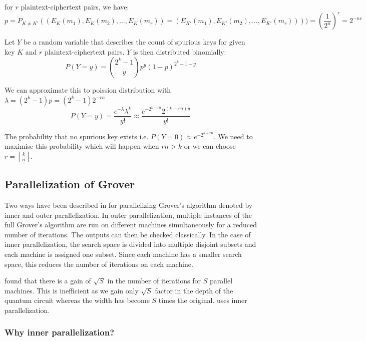 \documentclass[preprint]{transcrypto}
\begin{document}
for $r$ plaintext-ciphertext pairs, we have:
\begin{equation*}
    p = P_{K \not = K'}((E_K(m_1), E_K(m_2), \dots ,E_K(m_r) ) = (E_{K'}(m_1),E_{K'}(m_2), \dots, E_{K'}(m_r)) )) = \left(\frac{1}{2^n}\right)^r = 2^{-nr}
\end{equation*}

Let $Y$ be a random variable that describes the count of spurious keys for given key $K$ and $r$ plaintext-ciphertext pairs. $Y$ is then distributed binomially:
\begin{equation*}
    P(Y = y) = {2^k - 1 \choose y} p^y(1-p)^{2^k - 1- y}
\end{equation*}

We can approximate this to poission distribution with $\lambda = (2^k-1)p = (2^k - 1)2^{-rn} $
\begin{equation*}
    P(Y=y) = \frac{e^{-\lambda}\lambda^k}{y!} \approx  \frac{e^{-2^{k-rn}}2^{(k-rn)y}}{y!}
\end{equation*}

The probability that no spurious key exists i.e. $P(Y = 0) \approx e^{-2^{k-rn}}$. We need to maximise this probability which will happen when $rn > k$ or we can choose $r = \left\lceil \frac{k}{n} \right\rceil$.

\subsection{Parallelization of Grover}

Two ways have been described in \cite{tsc} for parallelizing Grover's algorithm denoted by inner and outer parallelization. In outer parallelization, multiple instances of the full Grover's algorithm are run on different machines simultaneously for a reduced number of iterations. The outputs can then be checked classically. In the case of inner parallelization, the search space is divided into multiple disjoint subsets and each machine is assigned one subset. Since each machine has a smaller search space, this reduces the number of iterations on each machine.

\cite{zalka} found that there is a gain of $\sqrt{S}$ in the number of iterations for $S$ parallel machines. This is inefficient as we gain only $\sqrt{S}$ factor in the depth of the quantum circuit whereas the width has become $S$ times the original. \cite{aeslowmc} uses inner parallelization.

\subsubsection{Why inner parallelization?}
\end{document}
